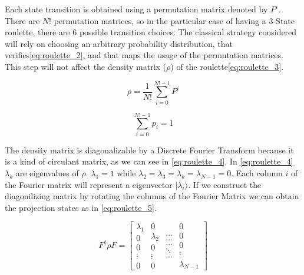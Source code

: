 Each state transition is obtained using a permutation matrix denoted by $P^{i}$. There are $N!$ permutation matrices, so in the particular case of having a $3$-State roulette, there are $6$ possible transition choices. The classical strategy considered will rely on choosing an arbitrary probability distribution, that verifies\ref{eq:roulette_2}, and that maps the usage of the permutation matrices. This step will not affect the density matrix ($\rho$) of the roulette\ref{eq:roulette_3}.

\begin{equation}
\label{eq:roulette_3}
\rho=\frac{1}{N!}\sum_{i=0}^{N!-1}P^{i}
\end{equation}

\begin{equation}
\label{eq:roulette_2}
\sum_{i=0}^{N!-1}p_{i}=1
\end{equation}

The density matrix is diagonalizable by a Discrete Fourier Transform because it is a kind of circulant matrix\cite{Davis1994}, as we can see in \ref{eq:roulette_4}. In \ref{eq:roulette_4} $\lambda_{k}$ are eigenvalues of $\rho$. $\lambda_{1}=1$
while $\lambda_{2}=\lambda_{3}=\lambda_{k}=\lambda_{N-1}=0$. Each column
$i$ of the Fourier matrix will represent a eigenvector $\vert\lambda_{i}\rangle$.
If we construct the diagonilizing matrix by rotating the columns of
the Fourier Matrix we can obtain the projection states as in \ref{eq:roulette_5}.

\begin{equation}
\label{eq:roulette_4}
F^{\dagger}\rho F=\left[\begin{array}{c}
\lambda_{1}\\
0\\
0\\
\vdots\\
0
\end{array}\begin{array}{c}
0\\
\lambda_{2}\\
0\\
\vdots\\
0
\end{array}\begin{array}{c}
\ldots\\
\ldots\\
\ldots\\
\ddots\\
\ldots
\end{array}\begin{array}{c}
0\\
0\\
0\\
\vdots\\
\lambda_{N-1}
\end{array}\right]
\end{equation}



